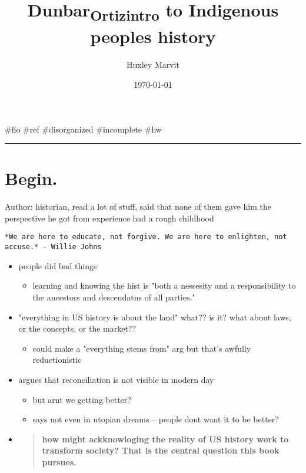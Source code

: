 \documentclass[letterpaper]{article}
\author{Huxley Marvit}
\date{\today}
\title{Dunbar\textsubscript{Ortiz}\textsubscript{intro} to Indigenous peoples history}
\renewcommand{\tableofcontents}{}
\begin{document}
\tableofcontents

\#flo \#ref \#disorganized \#incomplete \#hw

\noindent\rule{\textwidth}{0.5pt}

\section{Begin.}
\label{sec:orge4c1cd3}
Author: historian, read a lot of stuff, said that none of them gave him
the perspective he got from experience had a rough childhood

\begin{verbatim}
*We are here to educate, not forgive. We are here to enlighten, not accuse.* - Willie Johns
\end{verbatim}

\begin{itemize}
\item people did bad things

\begin{itemize}
\item learning and knowing the hist is "both a nessesity and a
responsibility to the ancestors and descendatns of all parties."
\end{itemize}

\item "everything in US history is about the land" what?? is it? what about
laws, or the concepts, or the market??

\begin{itemize}
\item could make a "everything stems from" arg but that's awfully
reductionistic
\end{itemize}

\item argues that reconciliation is not visible in modern day

\begin{itemize}
\item but arnt we getting better?
\item says not even in utopian dreams -- people dont want it to be better?
\end{itemize}

\item \begin{quote}
\textbf{how might ackknowloging the reality of US history work to transform
society? That is the central question this book pursues.}
\end{quote}


\end{itemize}
\end{document}
